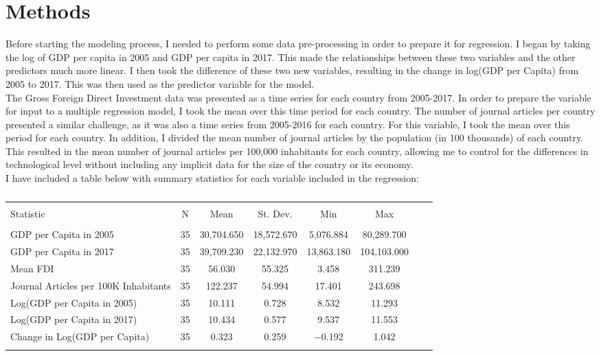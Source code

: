 \documentclass{article}
\begin{document}
\section{Methods}
\quad Before starting the modeling process, I needed to perform some data pre-processing in order to prepare it for regression. I began by taking the log of GDP per capita in 2005 and GDP per capita in 2017. This made the relationships between these two variables and the other predictors much more linear. I then took the difference of these two new variables, resulting in the change in log(GDP per Capita) from 2005 to 2017. This was then used as the predictor variable for the model.\\
\null\quad The Gross Foreign Direct Investment data was presented as a time series for each country from 2005-2017. In order to prepare the variable for input to a multiple regression model, I took the mean over this time period for each country. The number of journal articles per country presented a similar challenge, as it was also a time series from 2005-2016 for each country. For this variable, I took the mean over this period for each country. In addition, I divided the mean number of journal articles by the population (in 100 thousands) of each country. This resulted in the mean number of journal articles per 100,000 inhabitants for each country, allowing me to control for the differences in technological level without including any implicit data for the size of the country or its economy.\\
\null\quad I have included a table below with summary statistics for each variable included in the regression:
\begin{table}[!htbp] \centering 
  \caption{} 
  \label{} 
\begin{tabular}{@{\extracolsep{5pt}}lccccccc} 
\\[-1.8ex]\hline 
\hline \\[-1.8ex] 
Statistic & \multicolumn{1}{c}{N} & \multicolumn{1}{c}{Mean} & \multicolumn{1}{c}{St. Dev.} & \multicolumn{1}{c}{Min} & \multicolumn{1}{c}{Max} \\ 
\hline \\[-1.8ex] 
GDP per Capita in 2005 & 35 & 30,704.650 & 18,572.670 & 5,076.884 & 80,289.700 \\ 
GDP per Capita in 2017 & 35 & 39,709.230 & 22,132.970 & 13,863.180 & 104,103.000 \\ 
Mean FDI & 35 & 56.030 & 55.325 & 3.458 & 311.239 \\ 
Journal Articles per 100K Inhabitants & 35 & 122.237 & 54.994 & 17.401 & 243.698 \\ 
Log(GDP per Capita in 2005) & 35 & 10.111 & 0.728 & 8.532 & 11.293 \\ 
Log(GDP per Capita in 2017) & 35 & 10.434 & 0.577 & 9.537 & 11.553 \\ 
Change in Log(GDP per Capita) & 35 & 0.323 & 0.259 & $-$0.192 & 1.042 \\ 
\hline \\[-1.8ex] 
\end{tabular} 
\end{table}
\end{document}
